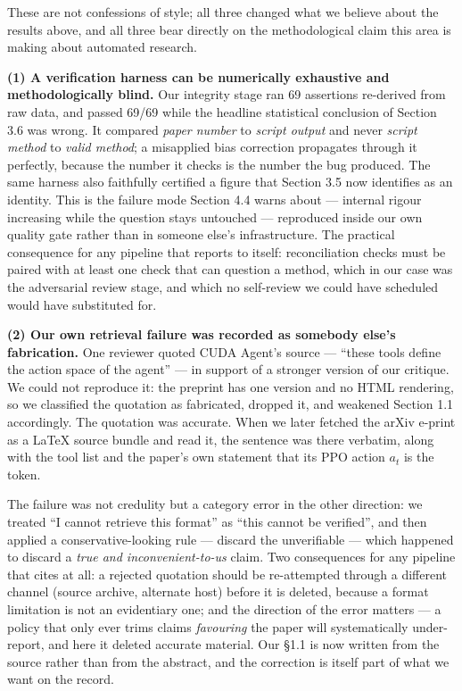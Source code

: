 \documentclass[
  11pt,
]{article}
\begin{document}
These are not confessions of style; all three changed what we believe about the results above, and all three bear directly on the methodological claim this area is making about automated research.

\textbf{(1) A verification harness can be numerically exhaustive and methodologically blind.} Our integrity stage ran 69 assertions re-derived from raw data, and passed 69/69 while the headline statistical conclusion of Section 3.6 was wrong. It compared \emph{paper number} to \emph{script output} and never \emph{script method} to \emph{valid method}; a misapplied bias correction propagates through it perfectly, because the number it checks is the number the bug produced. The same harness also faithfully certified a figure that Section 3.5 now identifies as an identity. This is the failure mode Section 4.4 warns about --- internal rigour increasing while the question stays untouched --- reproduced inside our own quality gate rather than in someone else's infrastructure. The practical consequence for any pipeline that reports to itself: reconciliation checks must be paired with at least one check that can question a method, which in our case was the adversarial review stage, and which no self-review we could have scheduled would have substituted for.

\textbf{(2) Our own retrieval failure was recorded as somebody else's fabrication.} One reviewer quoted CUDA Agent's source --- ``these tools define the action space of the agent'' --- in support of a stronger version of our critique. We could not reproduce it: the preprint has one version and no HTML rendering, so we classified the quotation as fabricated, dropped it, and weakened Section 1.1 accordingly. The quotation was accurate. When we later fetched the arXiv e-print as a LaTeX source bundle and read it, the sentence was there verbatim, along with the tool list and the paper's own statement that its PPO action \(a_t\) is the token.

The failure was not credulity but a category error in the other direction: we treated ``I cannot retrieve this format'' as ``this cannot be verified'', and then applied a conservative-looking rule --- discard the unverifiable --- which happened to discard a \emph{true and inconvenient-to-us} claim. Two consequences for any pipeline that cites at all: a rejected quotation should be re-attempted through a different channel (source archive, alternate host) before it is deleted, because a format limitation is not an evidentiary one; and the direction of the error matters --- a policy that only ever trims claims \emph{favouring} the paper will systematically under-report, and here it deleted accurate material. Our §1.1 is now written from the source rather than from the abstract, and the correction is itself part of what we want on the record.
\end{document}
